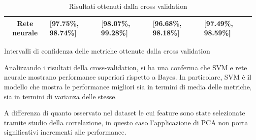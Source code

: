 \begin{table}[!ht]
\begin{subtable}[h]{1\textwidth}
\begin{tabular}{@{}cllll@{}}
            \cellcolor[HTML]{EFEFEF}\textbf{Rete neurale}         & [97.75\%, 98.74\%]   & [98.07\%, 99.28\%]  & [96.68\%, 98.18\%] & [97.49\%, 98.59\%] \\ \bottomrule
        \end{tabular}
        \caption{Intervalli di confidenza delle metriche ottenute dalla cross validation}
        \label{tab:intervalli_confidenza_pca}
    \end{subtable}
    \caption{Risultati ottenuti dalla cross validation}
    \label{tab:media_intervalli_confidenza_pca}
\end{table}

Analizzando i risultati della cross-validation, si ha una conferma che SVM e
rete neurale mostrano performance superiori rispetto a Bayes. In particolare,
SVM è il modello che mostra le performance migliori sia in termini di media delle
metriche, sia in termini di varianza delle stesse.

A differenza di quanto osservato nel dataset le cui feature sono state selezionate
tramite studio della correlazione, in questo caso l'applicazione di PCA non
porta significativi incrementi alle performance.

